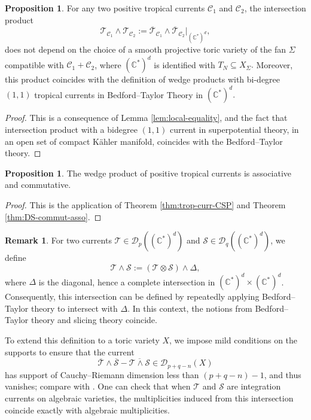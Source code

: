 \documentclass[11pt]{amsart}
\theoremstyle{definition}
\newtheorem{proposition}[theorem]{Proposition}
\newtheorem{remark}[theorem]{Remark}
\newcommand{\C}{\mathbb{C}}
\newcommand{\sD}{\mathscr{D}}
\newcommand{\cC}{\mathcal{C}}
\newcommand{\sT}{\mathscr{T}}
\newcommand{\sS}{\mathscr{S}}
\begin{document}
\begin{proposition}\label{prop:product-def-Cn}
    For any two positive tropical currents $\cC_1$ and $\cC_2$, the intersection product 
    $$
     \sT_{\cC_1} \wedge \sT_{\cC_2} :=  \overline{\sT}_{\cC_1} \wedge \overline{\sT}_{\cC_2}{|_{(\C^*)^d}},
    $$
    does not depend on the choice of a smooth projective toric variety of the fan $\Sigma$ compatible with $\cC_1 + \cC_2$, where $(\C^*)^d$ is identified with $T_N \subseteq X_{\Sigma}.$ Moreover, this product coincides with the definition of wedge products with bi-degree $(1,1)$ tropical currents in Bedford--Taylor Theory in $(\C^*)^d.$ 
\end{proposition}
\begin{proof}
This is a consequence of Lemma \ref{lem:local-equality}, and the fact that intersection product with a bidegree $(1,1)$ current in superpotential theory, in an open set of compact K\"ahler manifold, coincides with the Bedford--Taylor theory.
\end{proof}

 \begin{proposition}\label{prop:assoc-commut}
 The wedge product of positive tropical currents is associative and commutative.
\end{proposition}
\begin{proof}
  This is the application of Theorem \ref{thm:trop-curr-CSP} and Theorem \ref{thm:DS-commut-asso}.    
\end{proof}
\begin{remark}
For two currents $\sT \in \sD_p((\mathbb{C}^*)^d)$ and $\sS \in \sD_q((\mathbb{C}^*)^d)$, we define
\[
\sT \wedge \sS := (\sT \otimes \sS) \wedge \Delta,
\]
where $\Delta$ is the diagonal, hence a complete intersection in $(\mathbb{C}^*)^d \times (\mathbb{C}^*)^d$. Consequently, this intersection can be defined by repeatedly applying Bedford--Taylor theory to intersect with $\Delta$. In this context, the notions from Bedford--Taylor theory and slicing theory coincide.

To extend this definition to a toric variety $X$, we impose mild conditions on the supports to ensure that the current
\[
\overline{\sT} \wedge \overline{\sS} - \overline{\sT \wedge \sS} \in \sD_{p+q-n}(X)
\]
has support of Cauchy--Riemann dimension less than $(p+q-n)-1$, and thus vanishes; compare with \cite{BEGZ}. One can check that when $\sT$ and $\sS$ are integration currents on algebraic varieties, the multiplicities induced from this intersection coincide exactly with algebraic multiplicities.
\end{remark}
\end{document}
